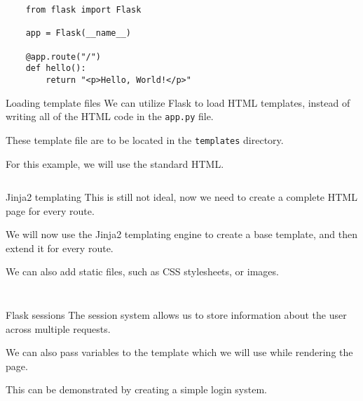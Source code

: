 \documentclass{beamer}
\begin{document}
	\begin{frame}[fragile]
		\begin{verbatim}
	from flask import Flask

	app = Flask(__name__)

	@app.route("/")
	def hello():
		return "<p>Hello, World!</p>"
		\end{verbatim}
	\end{frame}

	\begin{frame}{Loading template files}
		We can utilize Flask to load HTML templates, instead of writing all of the HTML code in the \texttt{app.py} file. \par
		
		These template file are to be located in the \texttt{templates} directory. \par

		For this example, we will use the standard HTML.
	\end{frame}


	\begin{frame}[fragile]
		\small
		\inputminted{python}{examples/2/app.py}
	\end{frame}

	\begin{frame}{Jinja2 templating}
		This is still not ideal, now we need to create a complete HTML page for every route. \par

		We will now use the Jinja2 templating engine to create a base template, and then extend it for every route.

		We can also add static files, such as CSS stylesheets, or images. \par
	\end{frame}

	\begin{frame}[fragile]
		\tiny
		\inputminted{html}{examples/3/templates/base.html}
	\end{frame}

	\begin{frame}[fragile]
		\small
		\inputminted{html}{examples/3/templates/register.html}
	\end{frame}

	\begin{frame}{Flask sessions}
		The session system allows us to store information about the user across multiple requests. \par

		We can also pass variables to the template which we will use while rendering the page. \par

		This can be demonstrated by creating a simple login system.
	\end{frame}
\end{document}
